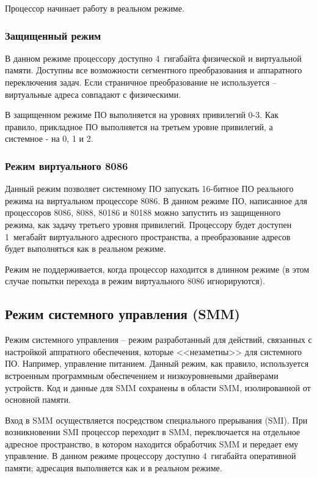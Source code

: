 Процессор начинает работу в реальном режиме.

\subsubsection*{Защищенный режим}
В данном режиме процессору доступно 4~гигабайта физической и виртуальной памяти. Доступны все возможности
сегментного преобразования и аппаратного переключения задач. Если страничное преобразование не используется --
виртуальные адреса совпадают с физическими.

В защищенном режиме ПО выполняется на уровнях привилегий 0-3. Как правило, прикладное ПО выполняется на третьем
уровне привилегий, а системное - на 0, 1 и 2.

\subsubsection*{Режим виртуального 8086}
Данный режим позволяет системному ПО запускать 16-битное ПО реального режима на виртуальном процессоре 8086.
В данном режиме ПО, написанное для процессоров 8086, 8088, 80186 и 80188 можно запустить из защищенного режима,
как задачу третьего уровня привилегий. Процессору будет доступен 1~мегабайт виртуального адресного пространства, а
преобразование адресов будет выполняться как в реальном режиме.

Режим не поддерживается, когда процессор находится в длинном режиме (в этом случае попытки перехода в режим
виртуального 8086 игнорируются).

\subsection{Режим системного управления (SMM)}
Режим системного управления -- режим разработанный для действий, связанных с настройкой аппратного обеспечения,
которые <<незаметны>> для системного ПО. Например, управление питанием. Данный режим, как правило, используется
встроенным программным обеспечением и низкоуровневыми драйверами устройств. Код и данные для SMM сохранены в
области SMM, изолированной от основной памяти.

Вход в SMM осуществляется посредством специального прерывания (SMI). При возникновении SMI процессор переходит
в SMM, переключается на отдельное адресное пространство, в котором находится обработчик SMM и передает ему управление.
В данном режиме процессору доступно 4~гигабайта оперативной памяти; адресация выполняется как и в реальном режиме.

